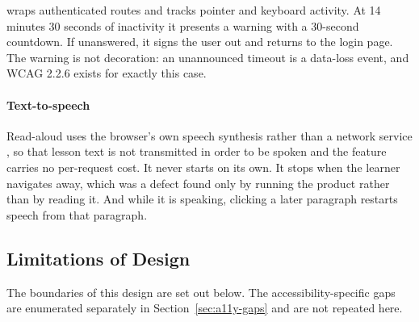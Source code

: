\documentclass[12pt, oneside]{article} %
\newcommand{\tcode}[1]{\path{#1}}
\begin{document}
\tcode{SessionTimeout} wraps authenticated routes and tracks pointer and keyboard activity. At 14 minutes 30 seconds of inactivity it presents a warning with a 30-second countdown. If unanswered, it signs the user out and returns to the login page. The warning is not decoration: an unannounced timeout is a data-loss event, and WCAG 2.2.6 exists for exactly this case.

\paragraph{Text-to-speech}

Read-aloud uses the browser's own speech synthesis rather than a network service \cite{webspeech_api}, so that lesson text is not transmitted in order to be spoken and the feature carries no per-request cost. It never starts on its own. It stops when the learner navigates away, which was a defect found only by running the product rather than by reading it. And while it is speaking, clicking a later paragraph restarts speech from that paragraph.

\subsection{Limitations of Design}
\label{sec:design-limitations}

The boundaries of this design are set out below. The accessibility-specific gaps are enumerated separately in Section~\ref{sec:a11y-gaps} and are not repeated here.
\end{document}
